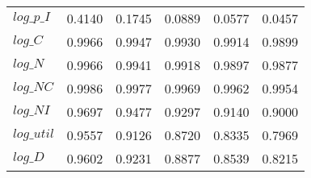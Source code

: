 \begin{center}
\begin{longtable}{lccccc}
$log\_p\_I  $	 & 	     0.4140	 & 	     0.1745	 & 	     0.0889	 & 	     0.0577	 & 	     0.0457 \\ 
$log\_C     $	 & 	     0.9966	 & 	     0.9947	 & 	     0.9930	 & 	     0.9914	 & 	     0.9899 \\ 
$log\_N     $	 & 	     0.9966	 & 	     0.9941	 & 	     0.9918	 & 	     0.9897	 & 	     0.9877 \\ 
$log\_NC    $	 & 	     0.9986	 & 	     0.9977	 & 	     0.9969	 & 	     0.9962	 & 	     0.9954 \\ 
$log\_NI    $	 & 	     0.9697	 & 	     0.9477	 & 	     0.9297	 & 	     0.9140	 & 	     0.9000 \\ 
$log\_util  $	 & 	     0.9557	 & 	     0.9126	 & 	     0.8720	 & 	     0.8335	 & 	     0.7969 \\ 
$log\_D     $	 & 	     0.9602	 & 	     0.9231	 & 	     0.8877	 & 	     0.8539	 & 	     0.8215 \\ 
\end{longtable}
 \end{center}
